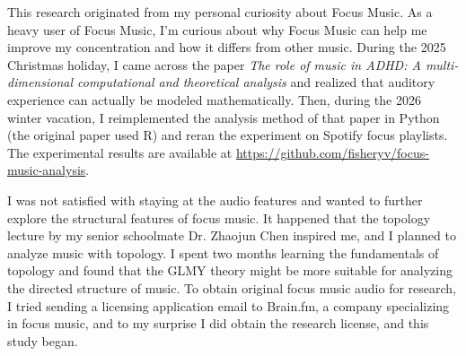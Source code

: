 \documentclass{article}
\begin{document}
This research originated from my personal curiosity about Focus Music. As a heavy user of Focus Music, I'm curious about why Focus Music can help me improve my concentration and how it differs from other music. During the 2025 Christmas holiday, I came across the paper \emph{The role of music in ADHD: A multi-dimensional computational and theoretical analysis} \cite{Achuthan2025} and realized that auditory experience can actually be modeled mathematically. Then, during the 2026 winter vacation, I reimplemented the analysis method of that paper in Python (the original paper used R) and reran the experiment on Spotify focus playlists. The experimental results are available at \url{https://github.com/fisheryv/focus-music-analysis}.

I was not satisfied with staying at the audio features and wanted to further explore the structural features of focus music. It happened that the topology lecture by my senior schoolmate Dr. Zhaojun Chen inspired me, and I planned to analyze music with topology. I spent two months learning the fundamentals of topology and found that the GLMY theory might be more suitable for analyzing the directed structure of music. To obtain original focus music audio for research, I tried sending a licensing application email to Brain.fm, a company specializing in focus music, and to my surprise I did obtain the research license, and this study  began.
\end{document}

